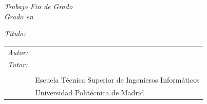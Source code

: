 \begin{titlepage}
  \vspace*{4cm}
  \noindent
  \textit{Trabajo Fin de Grado}\\
  \textit{Grado en} \Grado{}
  
  \textit{Título:} \TituloTFG{}

  \Fecha

  \vspace*{3cm}

  \noindent
  \begin{tabular}{ll}
     \textit{Autor:} & \NombreAutor{}  \\
     \textit{Tutor:} & \NombreTutor{}  \\
     & \Departamento{} \\
     & Escuela Técnica Superior de Ingenieros Informáticos\\
     & Universidad Politécnica de Madrid
  \end{tabular}

\end{titlepage}
